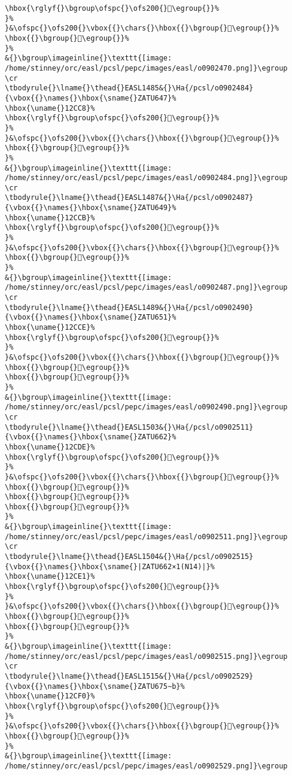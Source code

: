\begin{verbatim}
\hbox{\rglyf{}\bgroup\ofspc{}\ofs200{}𒲽\egroup{}}%
}%
}&\ofspc{}\ofs200{}\vbox{{}\chars{}\hbox{{}\bgroup{}𒲼\egroup{}}%
\hbox{{}\bgroup{}𒲽\egroup{}}%
}%
&{}\bgroup\imageinline{}\texttt{[image: /home/stinney/orc/easl/pcsl/pepc/images/easl/o0902470.png]}\egroup
\cr
\tbodyrule{}\lname{}\thead{}EASL1485&{}\Ha{/pcsl/o0902484}{\vbox{{}\names{}\hbox{\sname{}ZATU647}%
\hbox{\uname{}12CC8}%
\hbox{\rglyf{}\bgroup\ofspc{}\ofs200{}𒳈\egroup{}}%
}%
}&\ofspc{}\ofs200{}\vbox{{}\chars{}\hbox{{}\bgroup{}𒳈\egroup{}}%
\hbox{{}\bgroup{}𒳉\egroup{}}%
}%
&{}\bgroup\imageinline{}\texttt{[image: /home/stinney/orc/easl/pcsl/pepc/images/easl/o0902484.png]}\egroup
\cr
\tbodyrule{}\lname{}\thead{}EASL1487&{}\Ha{/pcsl/o0902487}{\vbox{{}\names{}\hbox{\sname{}ZATU649}%
\hbox{\uname{}12CCB}%
\hbox{\rglyf{}\bgroup\ofspc{}\ofs200{}𒳋\egroup{}}%
}%
}&\ofspc{}\ofs200{}\vbox{{}\chars{}\hbox{{}\bgroup{}𒳋\egroup{}}%
\hbox{{}\bgroup{}𒳌\egroup{}}%
}%
&{}\bgroup\imageinline{}\texttt{[image: /home/stinney/orc/easl/pcsl/pepc/images/easl/o0902487.png]}\egroup
\cr
\tbodyrule{}\lname{}\thead{}EASL1489&{}\Ha{/pcsl/o0902490}{\vbox{{}\names{}\hbox{\sname{}ZATU651}%
\hbox{\uname{}12CCE}%
\hbox{\rglyf{}\bgroup\ofspc{}\ofs200{}𒳎\egroup{}}%
}%
}&\ofspc{}\ofs200{}\vbox{{}\chars{}\hbox{{}\bgroup{}𒳘\egroup{}}%
\hbox{{}\bgroup{}𒳗\egroup{}}%
\hbox{{}\bgroup{}𒳎\egroup{}}%
}%
&{}\bgroup\imageinline{}\texttt{[image: /home/stinney/orc/easl/pcsl/pepc/images/easl/o0902490.png]}\egroup
\cr
\tbodyrule{}\lname{}\thead{}EASL1503&{}\Ha{/pcsl/o0902511}{\vbox{{}\names{}\hbox{\sname{}ZATU662}%
\hbox{\uname{}12CDE}%
\hbox{\rglyf{}\bgroup\ofspc{}\ofs200{}𒳞\egroup{}}%
}%
}&\ofspc{}\ofs200{}\vbox{{}\chars{}\hbox{{}\bgroup{}𒳤\egroup{}}%
\hbox{{}\bgroup{}𒳠\egroup{}}%
\hbox{{}\bgroup{}𒳞\egroup{}}%
\hbox{{}\bgroup{}𒳢\egroup{}}%
}%
&{}\bgroup\imageinline{}\texttt{[image: /home/stinney/orc/easl/pcsl/pepc/images/easl/o0902511.png]}\egroup
\cr
\tbodyrule{}\lname{}\thead{}EASL1504&{}\Ha{/pcsl/o0902515}{\vbox{{}\names{}\hbox{\sname{}|ZATU662×1(N14)|}%
\hbox{\uname{}12CE1}%
\hbox{\rglyf{}\bgroup\ofspc{}\ofs200{}𒳡\egroup{}}%
}%
}&\ofspc{}\ofs200{}\vbox{{}\chars{}\hbox{{}\bgroup{}𒳡\egroup{}}%
\hbox{{}\bgroup{}𒳟\egroup{}}%
\hbox{{}\bgroup{}𒳣\egroup{}}%
}%
&{}\bgroup\imageinline{}\texttt{[image: /home/stinney/orc/easl/pcsl/pepc/images/easl/o0902515.png]}\egroup
\cr
\tbodyrule{}\lname{}\thead{}EASL1515&{}\Ha{/pcsl/o0902529}{\vbox{{}\names{}\hbox{\sname{}ZATU675∼b}%
\hbox{\uname{}12CF0}%
\hbox{\rglyf{}\bgroup\ofspc{}\ofs200{}𒳰\egroup{}}%
}%
}&\ofspc{}\ofs200{}\vbox{{}\chars{}\hbox{{}\bgroup{}𒳯\egroup{}}%
\hbox{{}\bgroup{}𒳰\egroup{}}%
}%
&{}\bgroup\imageinline{}\texttt{[image: /home/stinney/orc/easl/pcsl/pepc/images/easl/o0902529.png]}\egroup

\end{verbatim}
